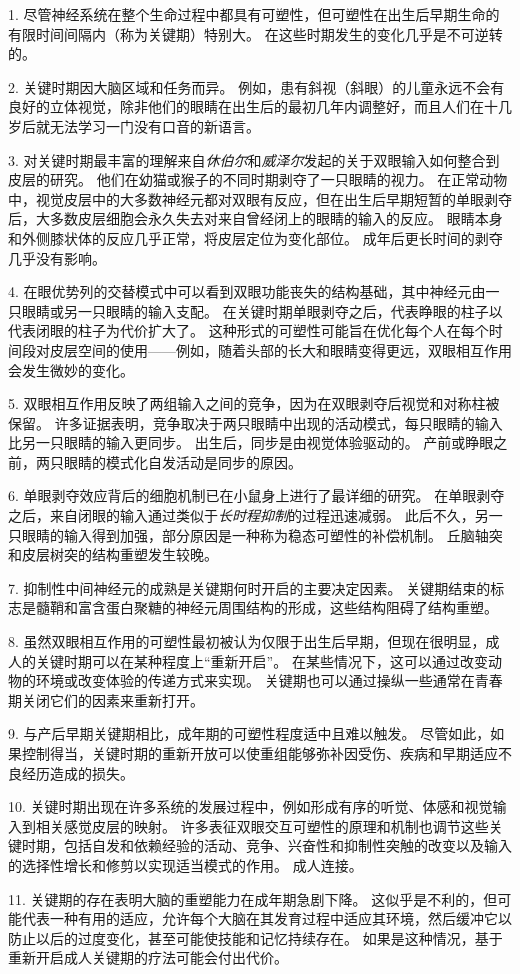1. 尽管神经系统在整个生命过程中都具有可塑性，但可塑性在出生后早期生命的有限时间间隔内（称为关键期）特别大。
在这些时期发生的变化几乎是不可逆转的。


2. 关键时期因大脑区域和任务而异。
例如，患有斜视（斜眼）的儿童永远不会有良好的立体视觉，除非他们的眼睛在出生后的最初几年内调整好，而且人们在十几岁后就无法学习一门没有口音的新语言。


3. 对关键时期最丰富的理解来自\textit{休伯尔}和\textit{威泽尔}发起的关于双眼输入如何整合到皮层的研究。
他们在幼猫或猴子的不同时期剥夺了一只眼睛的视力。
在正常动物中，视觉皮层中的大多数神经元都对双眼有反应，但在出生后早期短暂的单眼剥夺后，大多数皮层细胞会永久失去对来自曾经闭上的眼睛的输入的反应。
眼睛本身和外侧膝状体的反应几乎正常，将皮层定位为变化部位。
成年后更长时间的剥夺几乎没有影响。


4. 在眼优势列的交替模式中可以看到双眼功能丧失的结构基础，其中神经元由一只眼睛或另一只眼睛的输入支配。
在关键时期单眼剥夺之后，代表睁眼的柱子以代表闭眼的柱子为代价扩大了。
这种形式的可塑性可能旨在优化每个人在每个时间段对皮层空间的使用——例如，随着头部的长大和眼睛变得更远，双眼相互作用会发生微妙的变化。


5. 双眼相互作用反映了两组输入之间的竞争，因为在双眼剥夺后视觉和对称柱被保留。
许多证据表明，竞争取决于两只眼睛中出现的活动模式，每只眼睛的输入比另一只眼睛的输入更同步。
出生后，同步是由视觉体验驱动的。
产前或睁眼之前，两只眼睛的模式化自发活动是同步的原因。


6. 单眼剥夺效应背后的细胞机制已在小鼠身上进行了最详细的研究。
在单眼剥夺之后，来自闭眼的输入通过类似于\textit{长时程抑制}的过程迅速减弱。
此后不久，另一只眼睛的输入得到加强，部分原因是一种称为稳态可塑性的补偿机制。
丘脑轴突和皮层树突的结构重塑发生较晚。


7. 抑制性中间神经元的成熟是关键期何时开启的主要决定因素。
关键期结束的标志是髓鞘和富含蛋白聚糖的神经元周围结构的形成，这些结构阻碍了结构重塑。


8. 虽然双眼相互作用的可塑性最初被认为仅限于出生后早期，但现在很明显，成人的关键时期可以在某种程度上“重新开启”。
在某些情况下，这可以通过改变动物的环境或改变体验的传递方式来实现。
关键期也可以通过操纵一些通常在青春期关闭它们的因素来重新打开。


9. 与产后早期关键期相比，成年期的可塑性程度适中且难以触发。
尽管如此，如果控制得当，关键时期的重新开放可以使重组能够弥补因受伤、疾病和早期适应不良经历造成的损失。


10. 关键时期出现在许多系统的发展过程中，例如形成有序的听觉、体感和视觉输入到相关感觉皮层的映射。
许多表征双眼交互可塑性的原理和机制也调节这些关键时期，包括自发和依赖经验的活动、竞争、兴奋性和抑制性突触的改变以及输入的选择性增长和修剪以实现适当模式的作用。 成人连接。


11. 关键期的存在表明大脑的重塑能力在成年期急剧下降。
这似乎是不利的，但可能代表一种有用的适应，允许每个大脑在其发育过程中适应其环境，然后缓冲它以防止以后的过度变化，甚至可能使技能和记忆持续存在。
如果是这种情况，基于重新开启成人关键期的疗法可能会付出代价。



